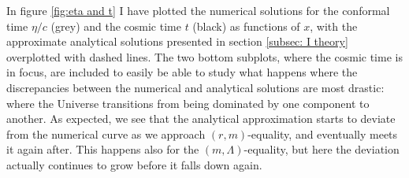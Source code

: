 \documentclass{aa}
\begin{document}
In figure \ref{fig:eta and t} I have plotted the numerical solutions for the conformal time $\eta/c$ (grey) and the cosmic time $t$ (black) as functions of $x$, with the approximate analytical solutions presented in section \ref{subsec: I theory} overplotted with dashed lines. The two bottom subplots, where the cosmic time is in focus, are included to easily be able to study what happens where the discrepancies between the numerical and analytical solutions are most drastic: where the Universe transitions from being dominated by one component to another. As expected, we see that the analytical approximation starts to deviate from the numerical curve as we approach $(r,m)$-equality, and eventually meets it again after. This happens also for the $(m,\Lambda)$-equality, but here the deviation actually continues to grow before it falls down again.
\end{document}

